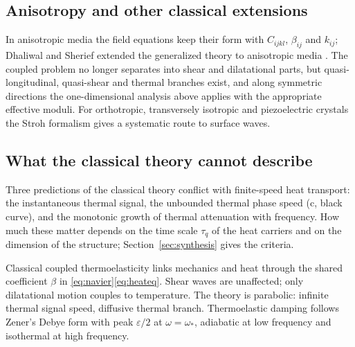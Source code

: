 \subsection{Anisotropy and other classical extensions}
In anisotropic media the field equations keep their form with $C_{ijkl}$, $\beta_{ij}$ and $k_{ij}$; Dhaliwal and Sherief extended the generalized theory to anisotropic media \citep{Dhaliwal1980}. The coupled problem no longer separates into shear and dilatational parts, but quasi-longitudinal, quasi-shear and thermal branches exist, and along symmetric directions the one-dimensional analysis above applies with the appropriate effective moduli. For orthotropic, transversely isotropic and piezoelectric crystals the Stroh formalism \citep{Stroh1958,Stroh1962} gives a systematic route to surface waves.

\subsection{What the classical theory cannot describe}
Three predictions of the classical theory conflict with finite-speed heat transport: the instantaneous thermal signal, the unbounded thermal phase speed (c, black curve), and the monotonic growth of thermal attenuation with frequency. How much these matter depends on the time scale $\tau_q$ of the heat carriers and on the dimension of the structure; Section~\ref{sec:synthesis} gives the criteria.

\begin{summarybox}[Summary]
Classical coupled thermoelasticity links mechanics and heat through the shared coefficient $\beta$ in \eqref{eq:navier}\textendash\eqref{eq:heateq}. Shear waves are unaffected; only dilatational motion couples to temperature. The theory is parabolic: infinite thermal signal speed, diffusive thermal branch. Thermoelastic damping follows Zener's Debye form with peak $\varepsilon/2$ at $\omega=\omega_*$, adiabatic at low frequency and isothermal at high frequency.
\end{summarybox}
